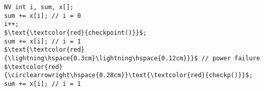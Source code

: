 \documentclass[border={20pt 5pt 10pt 10pt}]{standalone} %
\begin{document}
\begin{lstlisting}[style=mystyle, linewidth=95px]
NV int i, sum, x[];
sum += x[i]; // i = 0
i++;
$\text{\textcolor{red}{checkpoint()}}$;
sum += x[i]; // i = 1
$\text{\textcolor{red}{\lightning\hspace{0.3cm}\lightning\hspace{0.12cm}}}$ // power failure
$\textcolor{red}{\circlearrowright\hspace{0.28cm}}\text{\textcolor{red}{checkp()}}$;
sum += x[i]; // i = 1
\end{lstlisting}
\end{document}
